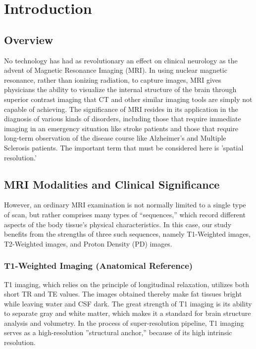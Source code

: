 \chapter{Introduction}

\section{Overview}
No technology has had as revolutionary an effect on clinical neurology as the advent of Magnetic Resonance Imaging (MRI). In using nuclear magnetic resonance, rather than ionizing radiation, to capture images, MRI gives physicians the ability to visualize the internal structure of the brain through superior contrast imaging that CT and other similar imaging tools are simply not capable of achieving. The significance of MRI resides in its application in the diagnosis of various kinds of disorders, including those that require immediate imaging in an emergency situation like stroke patients and those that require long-term observation of the disease course like Alzheimer's and Multiple Sclerosis patients. The important term that must be considered here is 'spatial resolution.'

\section{MRI Modalities and Clinical Significance}
However, an ordinary MRI examination is not normally limited to a single type of scan, but rather comprises many types of “sequences,” which record different aspects of the body tissue’s physical characteristics. In this case, our study benefits from the strengths of three such sequences, namely T1-Weighted images, T2-Weighted images, and Proton Density (PD) images.

\subsection{T1-Weighted Imaging (Anatomical Reference)}
T1 imaging, which relies on the principle of longitudinal relaxation, utilizes both short TR and TE values. The images obtained thereby make fat tissues bright while leaving water and CSF dark. The great strength of T1 imaging is its ability to separate gray and white matter, which makes it a standard for brain structure analysis and volumetry. In the process of super-resolution pipeline, T1 imaging serves as a high-resolution ''structural anchor,'' because of its high intrinsic resolution.

